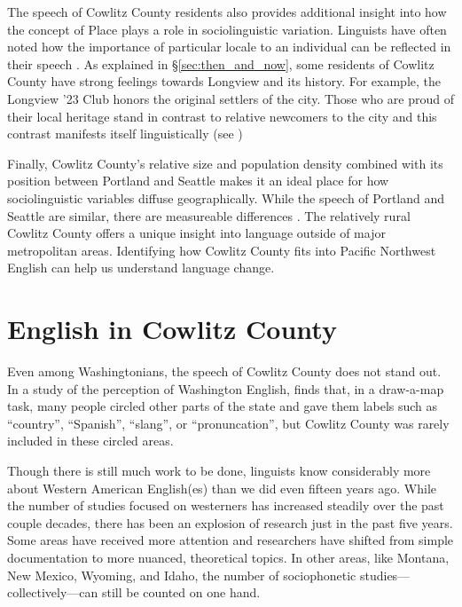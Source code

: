 The speech of Cowlitz County residents also provides additional insight into how the concept of Place plays a role in sociolinguistic variation. Linguists have often noted how the importance of particular locale to an individual can be reflected in their speech \citep{labov_1963, johnstone_etal_2002, carmichael_2014_diss, reed_2018}. As explained in \S\ref{sec:then_and_now}, some residents of Cowlitz County have strong feelings towards Longview and its history. For example, the Longview '23 Club honors the original settlers of the city. Those who are proud of their local heritage stand in contrast to relative newcomers to the city and this contrast manifests itself linguistically (see )

Finally, Cowlitz County's relative size and population density combined with its position between Portland and Seattle makes it an ideal place for how sociolinguistic variables diffuse geographically. While the speech of Portland and Seattle are similar, there are measureable differences \citep{becker_etal_2016_pads, wassink_2016_pads}. The relatively rural Cowlitz County offers a unique insight into language outside of major metropolitan areas. Identifying how Cowlitz County fits into Pacific Northwest English can help us understand language change.



\section{English in Cowlitz County}

Even among Washingtonians, the speech of Cowlitz County does not stand out. In a study of the perception of Washington English, \citet{evans_2011} finds that, in a draw-a-map task, many people circled other parts of the state and gave them labels such as ``country'', ``Spanish'', ``slang'', or ``pronuncation'', but Cowlitz County was rarely included in these circled areas.

Though there is still much work to be done, linguists know considerably more about Western American English(es) than we did even fifteen years ago. While the number of studies focused on westerners has increased steadily over the past couple decades, there has been an explosion of research just in the past five years. Some areas have received more attention and researchers have shifted from simple documentation to more nuanced, theoretical topics. In other areas, like Montana, New Mexico, Wyoming, and Idaho, the number of sociophonetic studies---collectively---can still be counted on one hand.

